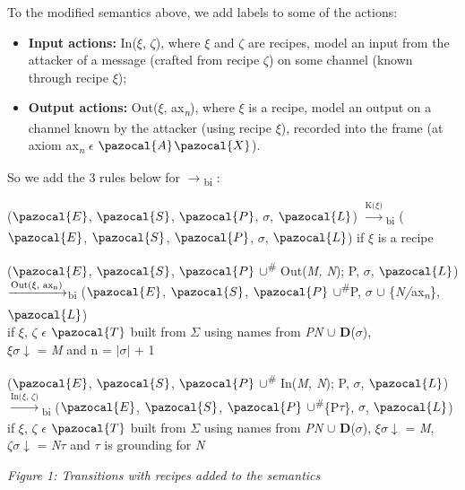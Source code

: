 \documentclass[11pt]{article}
\newcommand{\Sa}{\pazocal{S}}
\newcommand{\Lb}{\pazocal{L}}
\newcommand{\Ea}{\pazocal{E}}
\newcommand{\Ta}{\pazocal{T}}
\newcommand{\Aa}{\pazocal{A}}
\newcommand{\Xa}{\pazocal{X}}
\newcommand{\Pa}{\pazocal{P}}
\begin{document}
\vspace{8pt}
To the modified semantics above, we add labels to some of the actions:
\begin{itemize}
    \item {\bf Input actions:} In($\xi$, $\zeta$),  where $\xi$ and $\zeta$ are  recipes,  model an input from the attacker of a message (crafted from recipe $\zeta$) on some channel (known through recipe $\xi$); 
    \item {\bf Output actions:} Out($\xi$, ax\textsubscript{{\it n}}), where $\xi$ is  a  recipe, model an output on a channel known by the attacker (using recipe $\xi$), recorded into the frame (at axiom ax\textsubscript{{\it n}} $\epsilon$ $\Aa$$\Xa$).
\end{itemize}

So we add the 3 rules below for $\rightarrow$\textsubscript{bi} :
\vspace{4pt}
\begin{center}
    \hfill($\Ea$, $\Sa$, $\Pa$, $\sigma$, $\Lb$) {$\xrightarrow[\text{}]{\text{K($\xi$)}}$}\textsubscript{bi} ($\Ea$, $\Sa$, $\Pa$, $\sigma$, $\Lb$) \hfill if $\xi$ is a recipe\newline
    
    \vspace{4pt}
    ($\Ea$, $\Sa$, $\Pa$ $\cup$\textsuperscript{\#} {Out({\it M, N}); P}, $\sigma$, $\Lb$) {$\xrightarrow[\text{}]{\text{Out($\xi$, ax\textsubscript{n})}}$}\textsubscript{bi} ($\Ea$, $\Sa$, $\Pa$ $\cup$\textsuperscript{\#}{P}, $\sigma$ $\cup$ \{{\it N/}ax\textsubscript{{\it n}}\}, $\Lb$)\\
    \hfill \hfill if $\xi$, $\zeta$ $\epsilon$ $\Ta$ built from $\Sigma$ using names from {\it PN} $\cup$ {\bf D}($\sigma$),\\
    \hfill \hfill $\xi$$\sigma$$\downarrow$ = {\it M} and n = $\mid$$\sigma$$\mid$ + 1\newline
    
    
    \vspace{4pt}
    ($\Ea$, $\Sa$, $\Pa$ $\cup$\textsuperscript{\#} {In({\it M, N}); P}, $\sigma$, $\Lb$) {$\xrightarrow[\text{}]{\text{In($\xi$, $\zeta$)}}$}\textsubscript{bi} ($\Ea$, $\Sa$, $\Pa$ $\cup$\textsuperscript{\#}\{P$\tau$\}, $\sigma$, $\Lb$) \\
    \hfill \hfill if $\xi$, $\zeta$ $\epsilon$ $\Ta$ built from $\Sigma$ using names from {\it PN} $\cup$ {\bf D}($\sigma$), $\xi$$\sigma$$\downarrow$ = {\it M},\\ \hfill \hfill $\zeta$$\sigma$$\downarrow$ = {\it N}$\tau$ and $\tau$ is grounding for {\it N}
      
    \vspace{16pt}
    {\it Figure 1: Transitions with recipes added to the semantics}
    
\end{center}
\end{document}
